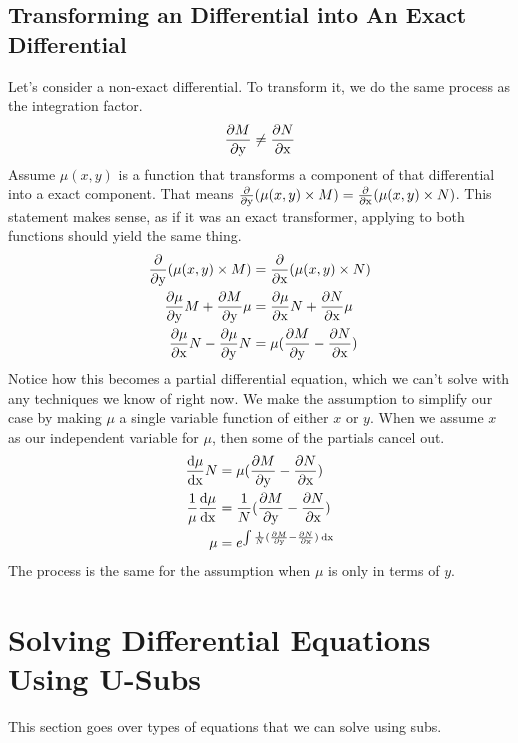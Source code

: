 \subsection{Transforming an Differential into An Exact Differential}
Let's consider a non-exact differential. To transform it, we do the same process as the integration factor. 
\begin{equation*}
	\frac{\partial M}{\partial\mathrm{y}} \neq \frac{\partial N}{\partial\mathrm{x}}
\end{equation*}
Assume $\mu(x,y)$ is a function that transforms a component of that differential into a exact component. That means $ \frac{\partial }{\partial\mathrm{y}}(\mu(x,y) \times M) = \frac{\partial }{\partial\mathrm{x}}(\mu(x,y) \times N)$. This statement makes sense, as if it was an exact transformer, applying to both functions should yield the same thing. 
\begin{align*}
	\frac{\partial }{\partial\mathrm{y}}(\mu(x,y) \times M) &= \frac{\partial }{\partial\mathrm{x}}(\mu(x,y) \times N) \\ 
	\frac{\partial \mu}{\partial\mathrm{y}}M + \frac{\partial M}{\partial\mathrm{y}}\mu &= \frac{\partial \mu}{\partial\mathrm{x}}N + \frac{\partial N}{\partial\mathrm{x}}\mu \\ 
	\frac{\partial \mu}{\partial\mathrm{x}}N - \frac{\partial \mu}{\partial\mathrm{y}}N &= \mu(\frac{\partial M}{\partial\mathrm{y}} - \frac{\partial N}{\partial\mathrm{x}})
\end{align*}
Notice how this becomes a partial differential equation, which we can't solve with any techniques we know of right now. We make the assumption to simplify our case by making $\mu$ a single variable function of either $x$ or $y$.
When we assume $x$ as our independent variable for $\mu$, then some of the partials cancel out. 
\begin{align*}
	\frac{\mathrm{d \mu}}{\mathrm{d x}}N &= \mu(\frac{\partial M}{\partial\mathrm{y}} - \frac{\partial N}{\partial\mathrm{x}}) \\ 
	\frac{1}{\mu} \frac{\mathrm{d \mu}}{\mathrm{d x}} &= \frac{1}{N}(\frac{\partial M}{\partial\mathrm{y}} - \frac{\partial N}{\partial\mathrm{x}}) \\  
	\mu &= e^ { \int\frac{1}{N}(\frac{\partial M}{\partial\mathrm{y}} - \frac{\partial N}{\partial\mathrm{x}}) \: \mathrm{dx}} 
\end{align*}
The process is the same for the assumption when $\mu$ is only in terms of $y$.

\pagebreak
\section{Solving Differential Equations Using U-Subs}
This section goes over types of equations that we can solve using subs.

